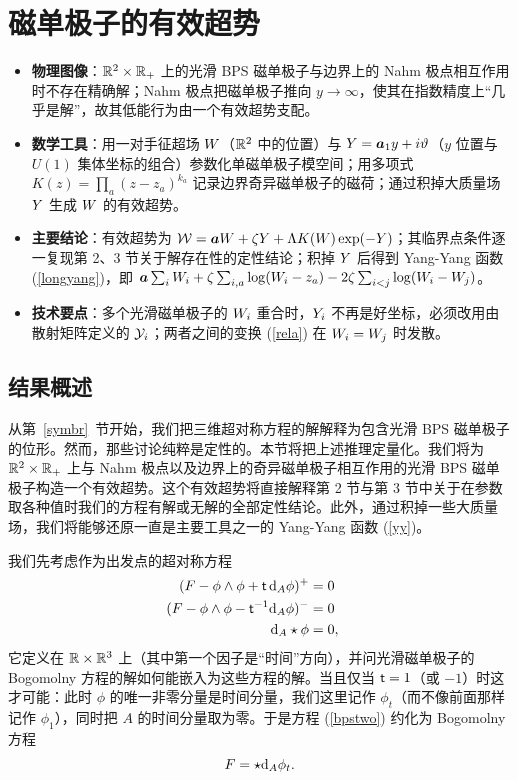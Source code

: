 \section{磁单极子的有效超势}\label{supermon}

\begin{keytakeaways}
\begin{itemize}\setlength{\itemsep}{2pt}
  \item \textbf{物理图像}：${\mathbb R}^2\times{\mathbb R}_+$ 上的光滑 BPS 磁单极子与边界上的 Nahm 极点相互作用时不存在精确解；Nahm 极点把磁单极子推向 $y\to\infty$，使其在指数精度上“几乎是解”，故其低能行为由一个有效超势支配。
  \item \textbf{数学工具}：用一对手征超场 ${ W}$（${\mathbb R}^2$ 中的位置）与 ${ Y}={\boldsymbol{a}}_1y+i\vartheta$（$y$ 位置与 $U(1)$ 集体坐标的组合）参数化单磁单极子模空间；用多项式 $K(z)=\prod_a(z-z_a)^{k_a}$ 记录边界奇异磁单极子的磁荷；通过积掉大质量场 ${ Y}$ 生成 ${ W}$ 的有效超势。
  \item \textbf{主要结论}：有效超势为 ${\mathcal W}={\boldsymbol{a}}{ W}+\zeta{ Y}+\Lambda K({ W})\exp(-{ Y})$；其临界点条件逐一复现第 2、3 节关于解存在性的定性结论；积掉 ${ Y}$ 后得到 Yang-Yang 函数 (\ref{longyang})，即 ${\boldsymbol{a}}\sum_i{ W}_i+\zeta\sum_{i,a}\log({ W}_i-z_a)-2\zeta\sum_{i<j}\log({ W}_i-{ W}_j)$。
  \item \textbf{技术要点}：多个光滑磁单极子的 ${ W}_i$ 重合时，${ Y}_i$ 不再是好坐标，必须改用由散射矩阵定义的 ${\mathcal Y}_i$；两者之间的变换 (\ref{rela}) 在 ${ W}_i={ W}_j$ 时发散。
\end{itemize}
\end{keytakeaways}

\subsection{结果概述}\label{outline}

从第~\ref{symbr}~节开始，我们把三维超对称方程的解解释为包含光滑 BPS 磁单极子的位形。然而，那些讨论纯粹是定性的。本节将把上述推理定量化。我们将为 ${\mathbb R}^2\times {\mathbb R}_+$ 上与 Nahm 极点以及边界上的奇异磁单极子相互作用的光滑 BPS 磁单极子构造一个有效超势。这个有效超势将直接解释第 2 节与第 3 节中关于在参数取各种值时我们的方程有解或无解的全部定性结论。此外，通过积掉一些大质量场，我们将能够还原一直是主要工具之一的 Yang-Yang 函数 (\ref{yy})。

我们先考虑作为出发点的超对称方程
\begin{align}\label{bpstwo} (F-\phi\wedge \phi + { \sf t} \,{\mathrm d}_A\phi)^+&=0   \cr
                             (F-\phi\wedge\phi-{ \sf t}^{-1}{\mathrm d}_A\phi  )^- &=0 \cr
                               {\mathrm d}_A\star\phi&=0,                     \end{align}
它定义在 ${\mathbb R}\times {\mathbb R}^3$ 上（其中第一个因子是“时间”方向），并问光滑磁单极子的 Bogomolny 方程的解如何能嵌入为这些方程的解。当且仅当 ${ \sf t}=1$（或 $-1$）时这才可能：此时 $\phi$ 的唯一非零分量是时间分量，我们这里记作 $\phi_t$（而不像前面那样记作 $\phi_1$），同时把 $A$ 的时间分量取为零。于是方程 (\ref{bpstwo}) 约化为 Bogomolny 方程
\begin{equation}\label{bog} F=\star {\mathrm d}_A\phi_t.\end{equation}

